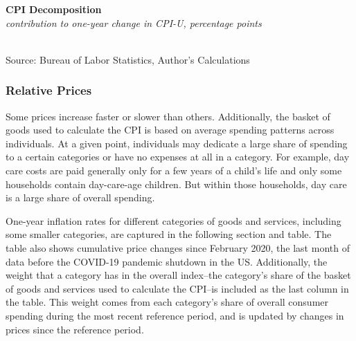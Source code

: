 \documentclass{report}
\makeatletter
\newcommand{\tbllink}[1]{\href{https://raw.githubusercontent.com/bdecon/US-chartbook/master/chartbook/data/#1}{\faTable}}
\newcommand*\short[1]{\expandafter\@gobbletwo\number\numexpr#1\relax}
\newcommand{\ctsbar}[5]{
		\addplot[ybar stacked, bar width=#5, draw opacity=0, fill=#1] 
			table [x=#2, y=#3, col sep=comma]{#4};}
\newcommand{\tydateaxisticks}{
		date coordinates in=x, axis line style={draw=none},
		xmax={2023-02-15s}, max space between ticks=40,	    
		xtick={{2011-01-01}, {2012-01-01}, {2013-01-01}, {2014-01-01}, {2015-01-01}, {2016-01-01}, 
			{2017-01-01}, {2018-01-01}, {2019-01-01}, {2020-01-01}, {2021-01-01}, {2022-01-01}, {2023-01-01}},
		enlarge y limits={0.06}, enlarge x limits={0.01},
		}
\newcommand{\bbar}[2]{extra #1 ticks = {{#2}}, extra #1 tick labels = ,
		extra #1 tick style = {grid=major, grid style={thick, black!25}},}
\newcommand{\rbars}{
		\fill[color=black!10] (axis cs:{1990-07-01},\pgfkeysvalueof{/pgfplots/ymin}) rectangle 
			(axis cs:{1991-03-01}, \pgfkeysvalueof{/pgfplots/ymax});
		\fill[color=black!10] (axis cs:{2007-12-01},\pgfkeysvalueof{/pgfplots/ymin}) rectangle 
			(axis cs:{2009-07-01}, \pgfkeysvalueof{/pgfplots/ymax});
		\fill[color=black!10] (axis cs:{2001-03-01},\pgfkeysvalueof{/pgfplots/ymin}) rectangle 
			(axis cs:{2001-11-01}, \pgfkeysvalueof{/pgfplots/ymax});
		\fill[color=black!10] (axis cs:{2020-02-01},\pgfkeysvalueof{/pgfplots/ymin}) rectangle 
			(axis cs:{2020-05-01}, \pgfkeysvalueof{/pgfplots/ymax});}
\makeatother
\begin{document}
{\begin{minipage}{0.76\textwidth}

\vspace{1mm}

\normalsize \textbf{CPI Decomposition}\\
\footnotesize{\textit{contribution to one-year change in CPI-U, percentage points}}\\
\hspace*{-2mm} \\
\footnotesize{Source: Bureau of Labor Statistics, Author's Calculations} \hfill \tbllink{cpi_decomp.csv}
\vspace{4mm}

\subsubsection*{Relative Prices}
\small Some prices increase faster or slower than others. Additionally, the basket of goods used to calculate the CPI is based on average spending patterns across individuals. At a given point, individuals may dedicate a large share of spending to a certain categories or have no expenses at all in a category. For example, day care costs are paid generally only for a few years of a child's life and only some households contain day-care-age children. But within those households, day care is a large share of overall spending. 

One-year inflation rates for different categories of goods and services, including some smaller categories, are captured in the following section and table. The table also shows cumulative price changes since February 2020, the last month of data before the COVID-19 pandemic shutdown in the US. Additionally, the weight that a category has in the overall index--the category's share of the basket of goods and services used to calculate the CPI--is included as the last column in the table. This weight comes from each category's share of overall consumer spending during the most recent reference period, and is updated by changes in prices since the reference period. 
\end{minipage}
\newpage
\begin{minipage}{0.76\textwidth}
\small 
\vspace{1.5mm}


\end{minipage}}
\end{document}

